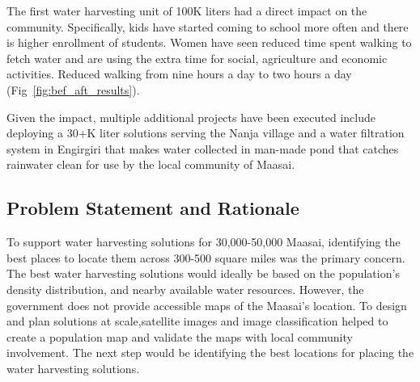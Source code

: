 \documentclass[10pt]{article}
\begin{document}
The first water harvesting unit of 100K liters had a direct impact on the community. Specifically, kids have started coming to school more often and there is higher enrollment of students. Women have seen reduced time spent walking to fetch water and are using the extra time for social, agriculture and economic activities. Reduced walking from nine hours a day to two hours a day (Fig~\ref{fig:bef_aft_results}). 

Given the impact, multiple additional projects have been executed include deploying a 30+K liter solutions serving the Nanja village and a water filtration system in Engirgiri that makes water collected in man-made pond that catches rainwater clean for use by the local community of Maasai.




\subsection{Problem Statement and Rationale}


To support water harvesting solutions for 30,000-50,000 Maasai, identifying the best places to locate them across 300-500 square miles was the primary concern. The best water harvesting solutions would ideally be based on the population's density distribution, and nearby available water resources. However, the government does not provide accessible maps of the Maasai's location. To design and plan solutions at scale,satellite images and image classification helped to create a population map and validate the maps with local community involvement. The next step would be identifying the best locations for placing the water harvesting solutions.



\end{document}
